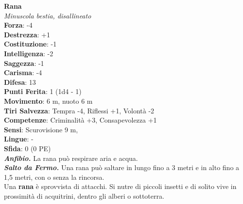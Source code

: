 \begin{multicols}{2}
\medskip\textbf{Rana}\\
\emph{Minuscola bestia, disallineato}\\
\textbf{Forza}: -4\\
\textbf{Destrezza}: +1\\
\textbf{Costituzione}: -1\\
\textbf{Intelligenza}: -2\\
\textbf{Saggezza}: -1\\
\textbf{Carisma}: -4\\
\textbf{Difesa}: 13\\
\textbf{Punti Ferita}: 1 (1d4 - 1)\\
\textbf{Movimento}: 6 m, nuoto 6 m\\
\textbf{Tiri Salvezza}:  Tempra -4, Riflessi +1, Volontà -2 \\
\textbf{Competenze}: Criminalità +3, Consapevolezza +1\\
\textbf{Sensi}: Scurovisione 9 m, \\
\textbf{Lingue}: -\\
\textbf{Sfida}: 0 (0 PE)\smallskip\\
\emph{\textbf{Anfibio.}} La rana può respirare aria e acqua.\\
\emph{\textbf{Salto da Fermo.}} Una rana può saltare in lungo fino a 3 metri e in alto fino a 1,5 metri, con o senza la rincorsa.\\
Una \textbf{rana} è sprovvista di attacchi. Si nutre di piccoli insetti e di solito vive in prossimità di acquitrini, dentro gli alberi o sottoterra.\\


\end{multicols}
